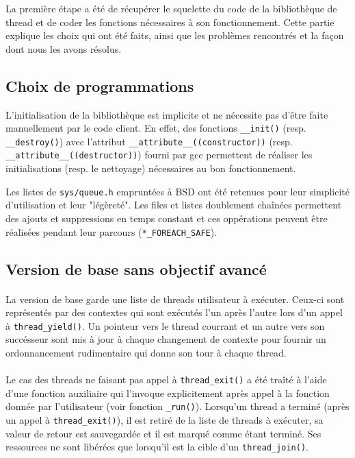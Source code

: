 La première étape a été de récupérer le squelette du code de la bibliothèque de thread et de coder les fonctions nécessaires à son fonctionnement. Cette partie explique les choix qui ont été faits, ainsi que les problèmes rencontrés et la façon dont nous les avons résolus.

\subsection{Choix de programmations}

L'initialisation de la bibliothèque est implicite et ne nécessite pas d'être
faite manuellement par le code client. En effet, des fonctions \verb!__init()!
(resp. \verb!__destroy()!) avec l'attribut \verb!__attribute__((constructor))!
(resp. \verb!__attribute__((destructor))!) fourni par gcc permettent de
réaliser les initialisations (resp. le nettoyage) nécessaires au bon
fonctionnement.

Les listes de \verb!sys/queue.h! empruntées à BSD ont été retenues pour leur
simplicité d'utilisation et leur "légèreté". Les files et listes doublement
chaînées permettent des ajouts et suppressions en temps constant et ces
oppérations peuvent être réalisées pendant leur parcours
(\verb!*_FOREACH_SAFE!).


\subsection{Version de base sans objectif avancé}

\paragraph{} La version de base garde une liste de threads utilisateur à exécuter. Ceux-ci sont représentés par des contextes qui sont exécutés l'un après l'autre lors d'un appel à \verb!thread_yield()!. Un pointeur vers le thread courrant et un autre vers son succésseur sont mis à jour à chaque changement de contexte pour fournir un ordonnancement rudimentaire qui donne son tour à chaque thread.

\paragraph{} Le cas des threads ne faisant pas appel à \verb!thread_exit()! a été traîté à l'aide d'une fonction auxiliaire qui l'invoque explicitement après appel à la fonction donnée par l'utilisateur (voir fonction \verb!_run()!). Lorsqu'un thread a terminé (après un appel à \verb!thread_exit()!), il est retiré de la liste de threads à exécuter, sa valeur de retour est sauvegardée et il est marqué comme étant terminé. Ses ressources ne sont libérées que lorsqu'il est la cible d'un \verb!thread_join()!.
